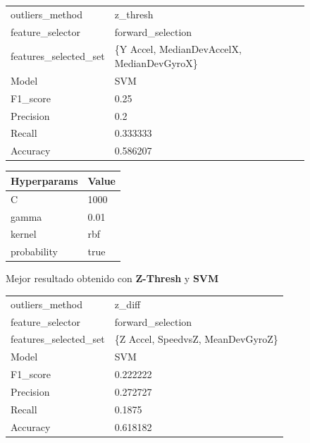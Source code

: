 \begin{appendices}
		\begin{figure}[htb]
			\centering
			\begin{tabular}{ll}
				\toprule
					  outliers\_method &                                   z\_thresh \\
					 feature\_selector &                          forward\_selection \\
				features\_selected\_set & \{Y Accel, MedianDevAccelX, MedianDevGyroX\} \\
								Model &                                        SVM \\
						F1\_score &                                       0.25 \\
					   Precision &                                        0.2 \\
						  Recall &                                   0.333333 \\
						Accuracy &                                   0.586207 \\
				\bottomrule
			\end{tabular}
			\newline
			\newline

			\begin{tabular}{ll}
				\toprule
				Hyperparams & Value \\
				\midrule
						  C &  1000 \\
					  gamma &  0.01 \\
					 kernel &   rbf \\
				probability &  true \\
				\bottomrule
			\end{tabular}
			\caption{Mejor resultado obtenido con \textbf{Z-Thresh} y \textbf{SVM}}
			\label{table:25}
		\end{figure}

		\begin{figure}[htb]
			\centering
			\begin{tabular}{ll}
				\toprule
					  outliers\_method &                            z\_diff \\
					 feature\_selector &                 forward\_selection \\
				features\_selected\_set & \{Z Accel, SpeedvsZ, MeanDevGyroZ\} \\
								Model &                               SVM \\
						F1\_score &                          0.222222 \\
					   Precision &                          0.272727 \\
						  Recall &                            0.1875 \\
						Accuracy &                          0.618182 \\
				\bottomrule
			\end{tabular}
			\newline
			\newline


\end{figure}
\end{appendices}
